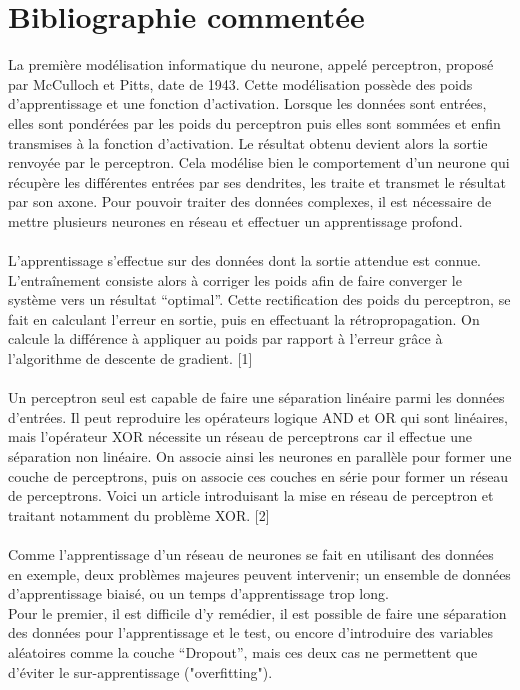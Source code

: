 \documentclass[12pt,a4paper, french]{article}
\begin{document}
\section*{Bibliographie commentée}
La première modélisation informatique du neurone, appelé perceptron, proposé par McCulloch et Pitts, date de 1943. Cette modélisation possède des poids d'apprentissage et une fonction d’activation. Lorsque les données sont entrées, elles sont pondérées par les poids du perceptron puis elles sont sommées et enfin transmises à la fonction d’activation. Le résultat obtenu devient alors la sortie renvoyée par le perceptron. Cela modélise bien le comportement d’un neurone qui récupère les différentes entrées par ses dendrites, les traite et transmet le résultat par son axone. Pour pouvoir traiter des données complexes, il est nécessaire de mettre plusieurs neurones en réseau et effectuer un apprentissage profond. \\
\\
L’apprentissage s'effectue sur des données dont la sortie attendue est connue. L’entraînement consiste alors à corriger les poids afin de faire converger le système vers un résultat “optimal”. Cette rectification des poids du perceptron, se fait en calculant l’erreur en sortie, puis en effectuant la rétropropagation. On calcule la différence à appliquer au poids par rapport à l'erreur grâce à l’algorithme de descente de gradient. [1]\\
\\
Un perceptron seul est capable de faire une séparation linéaire parmi les données d’entrées. Il peut reproduire les opérateurs logique AND et OR qui sont linéaires, mais l'opérateur XOR nécessite un réseau de perceptrons car il effectue une séparation non linéaire. On associe ainsi les neurones en parallèle pour former une couche de perceptrons, puis on associe ces couches en série pour former un réseau de perceptrons. Voici un article introduisant la mise en réseau de perceptron et traitant notamment du problème XOR. [2]\\
\\
Comme l’apprentissage d’un réseau de neurones se fait en utilisant des données en exemple, deux problèmes majeures peuvent intervenir; un ensemble de données d’apprentissage biaisé, ou un temps d’apprentissage trop long. \\
Pour le premier, il est difficile d’y remédier, il est possible de faire une séparation des données pour l’apprentissage et le test, ou encore d’introduire des variables aléatoires comme la couche “Dropout”, mais ces deux cas ne permettent que d’éviter le sur-apprentissage ("overfitting"). \\
\end{document}
